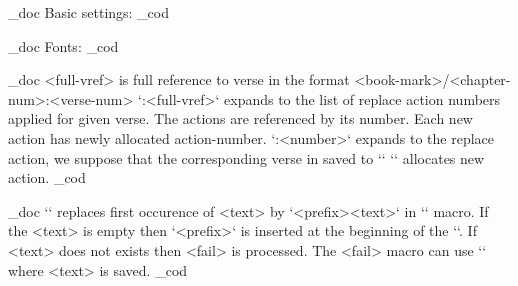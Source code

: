 
   \_doc
   Basic settings:
   \_cod

\load[vlna]
\load[mte]

\iftrue 
   \fontfam[biblon]
\else 
   \fontfam[lmfonts]
\fi

\chyph
\enablemte

\typosize[11/13]
\hyperlinks\Blue\Blue

\raggedbottom
\parindent=20pt

   \_doc
   Fonts:
   \_cod

\fontdef{}
\fontdef{}
\fontdef{}

   \_doc
   <full-vref> is full reference to verse in the format
               <book-mark>/<chapter-num>:<verse-num>\nl
   `\alist:<full-vref>` expands to the list of replace action numbers applied 
   for given verse. The actions are referenced by its number. Each new action has newly
   allocated action-number.\nl
   `\action:<number>` expands to the replace action, we suppose that the
   corresponding verse in saved to `\tmpb`\nl
   `` allocates new action.
   \_cod

\newcount\actionnum
\def\newaction#1#2{\incr\actionnum
   \unless\ifcsname alist:#1\endcsname \sxdef{alist:#1}{}\fi
   \sxdef{alist:#1}{\cs{alist:#1}\the\actionnum,}%
   \global\sdef{action:\the\actionnum}{#2}%
}

   \_doc
   `` replaces first occurence of <text>
   by `<prefix>{<text>}` in `\tmpb` macro. If the <text> is empty then
   `<prefix>{}` is inserted at the beginning of the `\tmpb`.\nl
   If <text> does not exists then <fail> is processed. The <fail>
   macro can use `\text` where <text> is saved.
   \_cod

\def\replpre#1#2#3{%
   \ifx^#2^\def\tmp{#1{}}\ea\ea\ea\def\ea\ea\ea\tmpb\ea\ea\ea{\ea\tmp\tmpb}%
   \else
      \def\replpredo##1#2##2\end{%
         \ifx^##2^\def\text{#2}#3%
         \else \replsave ##1#1{#2}##2\end \fi
      }%
      \def\replsave##1#2\end{\def\tmpb{##1}}%
      \ea\replpredo\tmpb#2\end
   \fi
}


